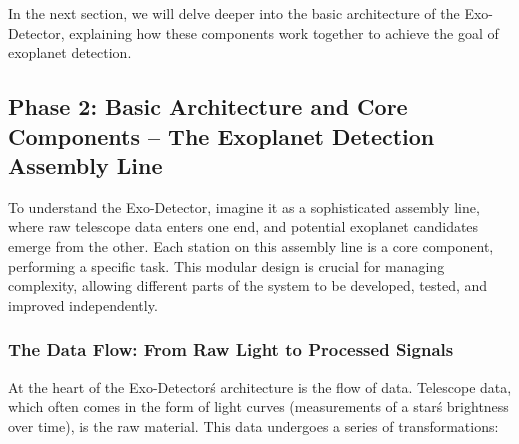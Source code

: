 \documentclass{article}
\begin{document}
In the next section, we will delve deeper into the basic architecture of the Exo-Detector, explaining how these components work together to achieve the goal of exoplanet detection.

\subsection{Phase 2: Basic Architecture and Core Components – The Exoplanet Detection Assembly Line}

To understand the Exo-Detector, imagine it as a sophisticated assembly line, where raw telescope data enters one end, and potential exoplanet candidates emerge from the other. Each station on this assembly line is a core component, performing a specific task. This modular design is crucial for managing complexity, allowing different parts of the system to be developed, tested, and improved independently.

\subsubsection{The Data Flow: From Raw Light to Processed Signals}

At the heart of the Exo-Detector\'s architecture is the flow of data. Telescope data, which often comes in the form of light curves (measurements of a star\'s brightness over time), is the raw material. This data undergoes a series of transformations:
\end{document}
